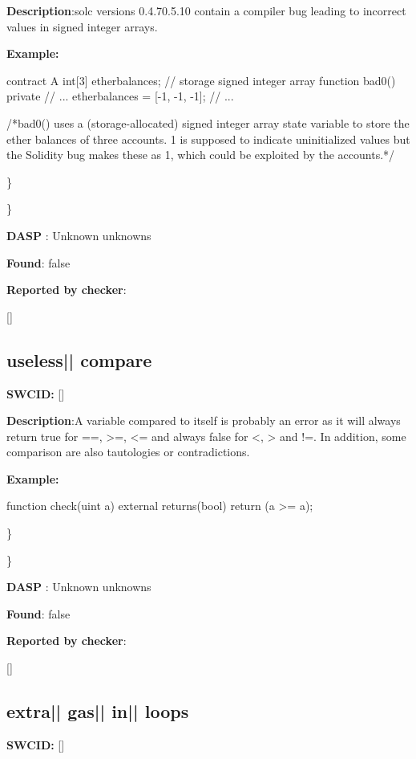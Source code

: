 \documentclass{article}
\begin{document}
\textbf{Description}:solc versions 0.4.7{\textendash}0.5.10 contain a compiler bug leading to incorrect values in signed integer arrays.


\textbf{Example:} 
\begin{ffcode} 

contract A {
  int[3] ether\textunderscore balances; // storage signed integer array
  function bad0() private {
    // ...
    ether\textunderscore balances = [-1, -1, -1];
    // ...
  }
}

 /*bad0() uses a (storage-allocated) signed integer array state variable to store the ether balances of three accounts. 1 is supposed to indicate uninitialized values but the Solidity bug makes these as 1, which could be exploited by the accounts.*/ 

\end{ffcode} 
\} 

\} 

\textbf{DASP} : Unknown unknowns

\textbf{Found}: false

\textbf{Reported by checker}: 
\begin{ffcode} 

[]
\end{ffcode} 
\subsection{useless{|\textunderscore| }compare} 
\textbf{SWC{\textunderscore }ID:} []

\textbf{Description}:A variable compared to itself is probably an error as it will always return true for ==, >=, <= and always false for <, > and !=. In addition, some comparison are also tautologies or contradictions.


\textbf{Example:} 
\begin{ffcode} 

function check(uint a) external returns(bool){
    return (a >= a);
}

\end{ffcode} 
\} 

\} 

\textbf{DASP} : Unknown unknowns

\textbf{Found}: false

\textbf{Reported by checker}: 
\begin{ffcode} 

[]
\end{ffcode} 
\subsection{extra{|\textunderscore| }gas{|\textunderscore| }in{|\textunderscore| }loops} 
\textbf{SWC{\textunderscore }ID:} []
\end{document}
